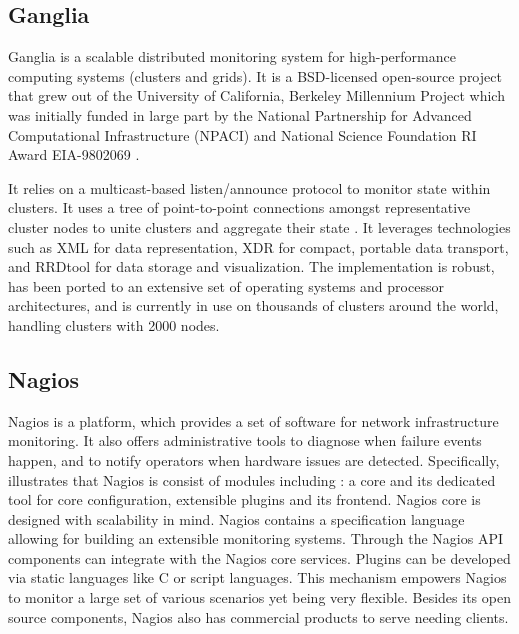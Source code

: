\subsection{ Ganglia}

     Ganglia is a scalable distributed monitoring system for
     high-performance computing systems (clusters and grids). It is a
     BSD-licensed open-source project that grew out of the University
     of California, Berkeley Millennium Project which was initially
     funded in large part by the National Partnership for Advanced
     Computational Infrastructure (NPACI) and National Science
     Foundation RI Award EIA-9802069 \cite{www-gms}.

     It relies on a multicast-based listen/announce protocol to
     monitor state within clusters. It uses a tree of point-to-point
     connections amongst representative cluster nodes to unite
     clusters and aggregate their state \cite{www-gsoft}. It
     leverages technologies such as XML for data representation, XDR
     for compact, portable data transport, and RRDtool for data
     storage and visualization. The implementation is robust, has been
     ported to an extensive set of operating systems and processor
     architectures, and is currently in use on thousands of clusters
     around the world, handling clusters with 2000 nodes.
     
\subsection{ Nagios \cite{www-nagios}}

     Nagios is a platform, which provides a set of software for
     network infrastructure monitoring. It also offers administrative
     tools to diagnose when failure events happen, and to notify
     operators when hardware issues are detected. Specifically,
     illustrates that Nagios is consist of modules including
     \cite{nagios-book}: a core and its dedicated tool for core
     configuration, extensible plugins and its frontend. Nagios core
     is designed with scalability in mind.  Nagios contains a
     specification language allowing for building an extensible
     monitoring systems.  Through the Nagios API components can
     integrate with the Nagios core services. Plugins can be developed
     via static languages like C or script languages. This mechanism
     empowers Nagios to monitor a large set of various scenarios yet
     being very flexible. \cite{nagios-paper-2012} Besides its open
     source components, Nagios also has commercial products to serve
     needing clients.


